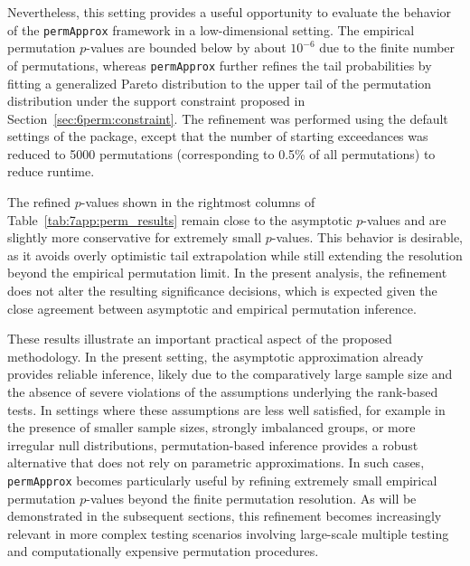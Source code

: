 Nevertheless, this setting provides a useful opportunity to evaluate the behavior of the \texttt{permApprox} framework in a low-dimensional setting. The empirical permutation $p$-values are bounded below by about $10^{-6}$ due to the finite number of permutations, whereas \texttt{permApprox} further refines the tail probabilities by fitting a generalized Pareto distribution to the upper tail of the permutation distribution under the support constraint proposed in Section~\ref{sec:6perm:constraint}. The refinement was performed using the default settings of the package, except that the number of starting exceedances was reduced to 5000 permutations (corresponding to 0.5\% of all permutations) to reduce runtime.

The refined $p$-values shown in the rightmost columns of Table~\ref{tab:7app:perm_results} remain close to the asymptotic $p$-values and are slightly more conservative for extremely small $p$-values. This behavior is desirable, as it avoids overly optimistic tail extrapolation while still extending the resolution beyond the empirical permutation limit. In the present analysis, the refinement does not alter the resulting significance decisions, which is expected given the close agreement between asymptotic and empirical permutation inference.

These results illustrate an important practical aspect of the proposed methodology. In the present setting, the asymptotic approximation already provides reliable inference, likely due to the comparatively large sample size and the absence of severe violations of the assumptions underlying the rank-based tests. In settings where these assumptions are less well satisfied, for example in the presence of smaller sample sizes, strongly imbalanced groups, or more irregular null distributions, permutation-based inference provides a robust alternative that does not rely on parametric approximations. In such cases, \texttt{permApprox} becomes particularly useful by refining extremely small empirical permutation $p$-values beyond the finite permutation resolution. As will be demonstrated in the subsequent sections, this refinement becomes increasingly relevant in more complex testing scenarios involving large-scale multiple testing and computationally expensive permutation procedures.


